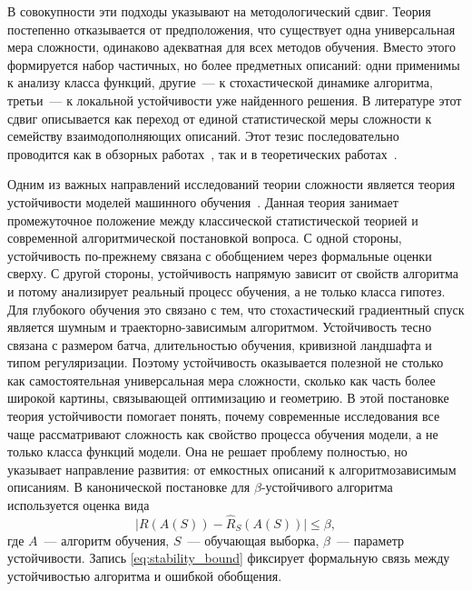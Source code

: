 \documentclass[russian]{intsys}
\begin{document}
В совокупности эти подходы указывают на методологический сдвиг.
Теория постепенно отказывается от предположения, что существует одна универсальная мера сложности, одинаково адекватная для всех методов обучения.
Вместо этого формируется набор частичных, но более предметных описаний: одни применимы к анализу класса функций, другие~--- к стохастической динамике алгоритма, третьи~--- к локальной устойчивости уже найденного решения.
В литературе этот сдвиг описывается как переход от единой статистической меры сложности к семейству взаимодополняющих описаний. Этот тезис последовательно проводится как в обзорных работах~\cite{hu2021complexitysurvey,recent2020theory,belkin2021overview}, так и в теоретических работах~\cite{explaining2021thesis,kawaguchi2017generalization,poggio2020theoretical,poggio2017nonoverfitting}.

Одним из важных направлений исследований теории сложности является теория устойчивости моделей машинного обучения~\cite{bousquet2002stability,hardt2016train}.
Данная теория занимает промежуточное положение между классической статистической теорией и современной алгоритмической постановкой вопроса.
С одной стороны, устойчивость по-прежнему связана с обобщением через формальные оценки сверху.
С другой стороны, устойчивость напрямую зависит от свойств алгоритма и потому анализирует реальный процесс обучения, а не только класса гипотез.
Для глубокого обучения это связано с тем, что стохастический градиентный спуск является шумным и траекторно-зависимым алгоритмом.
Устойчивость тесно связана с размером батча, длительностью обучения, кривизной ландшафта и типом регуляризации.
Поэтому устойчивость оказывается полезной не столько как самостоятельная универсальная мера сложности, сколько как часть более широкой картины, связывающей оптимизацию и геометрию.
В этой постановке теория устойчивости помогает понять, почему современные исследования все чаще рассматривают сложность как свойство процесса обучения модели, а не только класса функций модели.
Она не решает проблему полностью, но указывает направление развития: от емкостных описаний к алгоритмозависимым описаниям.
В канонической постановке для $\beta$-устойчивого алгоритма используется оценка вида
\begin{equation}
\bigl|R(A(S))-\hat R_S(A(S))\bigr|\le \beta,
\label{eq:stability_bound}
\end{equation}
где $A$~--- алгоритм обучения, $S$~--- обучающая выборка, $\beta$~--- параметр устойчивости. Запись \eqref{eq:stability_bound} фиксирует формальную связь между устойчивостью алгоритма и ошибкой обобщения.
\end{document}
